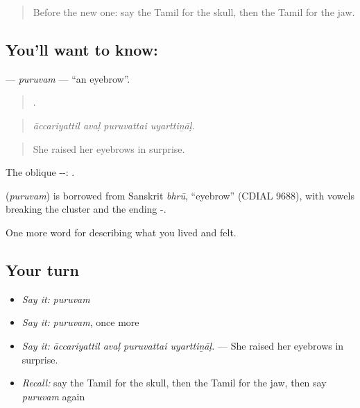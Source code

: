 \begin{quote}
Before the new one: say the Tamil for the skull, then the Tamil for the jaw.
\end{quote}

\subsection*{You'll want to know: }
\textbf{} — \emph{puruvam} — \textquotedblleft{}an eyebrow\textquotedblright{}.

\begin{quote}
   .
\end{quote}

\begin{quote}
\emph{āccariyattil avaḷ puruvattai uyarttiṉāḷ.}
\end{quote}

\begin{quote}
She raised her eyebrows in surprise.
\end{quote}

The oblique --: .

\begin{cousinweb}
\textbf{} (\emph{puruvam}) is borrowed from Sanskrit \emph{bhrū}, \textquotedblleft{}eyebrow\textquotedblright{} (CDIAL 9688), with vowels breaking the cluster and the ending -.
\end{cousinweb}

\begin{grammarlens}[title={What you've built}]
One more word for describing what you lived and felt.
\end{grammarlens}

\subsection*{Your turn}
\begin{itemize}
\raggedright
  \item \emph{Say it:} \emph{puruvam}
  \item \emph{Say it:} \emph{puruvam}, once more
  \item \emph{Say it:} \emph{āccariyattil avaḷ puruvattai uyarttiṉāḷ.} — She raised her eyebrows in surprise.
  \item \emph{Recall:} say the Tamil for the skull, then the Tamil for the jaw, then say \emph{puruvam} again
\end{itemize}

